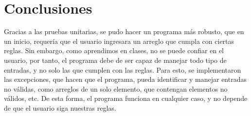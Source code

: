 \documentclass{article}
\begin{document}
\section{Conclusiones}

Gracias a las pruebas unitarias, se pudo hacer un programa más robusto, que en un inicio, requería que el usuario ingresara un arreglo que cumpla con ciertas reglas. Sin embargo, como aprendimos en clases, no se puede confiar en el usuario, por tanto, el programa debe de ser capaz de manejar todo tipo de entradas, y no solo las que cumplen con las reglas. Para esto, se implementaron las excepciones, que hacen que el programa, pueda identificar y manejar entradas no válidas, como arreglos de un solo elemento, que contengan elementos no válidos, etc. De esta forma, el programa funciona en cualquier caso, y no depende de que el usuario siga nuestras reglas.
\end{document}
